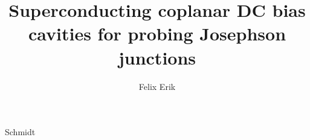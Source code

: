 \documentclass{dissertation-edit}
\begin{document}
\title[]{Superconducting coplanar DC bias cavities for probing Josephson junctions}
\author{Felix Erik}{Schmidt}

%
%
%
\mainmatter
%
\thumbtrue
%


%
%
%
%
%

%
%
%
\thumbfalse
%
%
%


\end{document}
